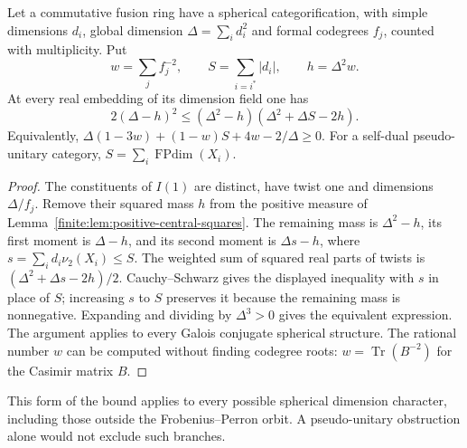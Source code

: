 \begin{proposition}\label{finite:prop:spherical-codegree-moment}
Let a commutative fusion ring have a spherical categorification, with
simple dimensions $d_i$, global dimension $\Delta=\sum_i d_i^2$ and
formal codegrees $f_j$, counted with multiplicity. Put
\[
 w=\sum_j f_j^{-2},\qquad
 S=\sum_{i=i^*}|d_i|,\qquad h=\Delta^2w.
\]
At every real embedding of its dimension field one has
\begin{equation}\label{finite:eq:spherical-codegree-moment}
 2(\Delta-h)^2\leq
 (\Delta^2-h)(\Delta^2+\Delta S-2h).
\end{equation}
Equivalently,
$\Delta(1-3w)+(1-w)S+4w-2/\Delta\geq0$.
For a self-dual pseudo-unitary category,
$S=\sum_i\operatorname{FPdim}(X_i)$.
\end{proposition}
\begin{proof}
The constituents of $I(1)$ are distinct, have twist one and dimensions
$\Delta/f_j$. Remove their squared mass $h$ from the positive measure
of Lemma~\ref{finite:lem:positive-central-squares}. The remaining mass is
$\Delta^2-h$, its first moment is $\Delta-h$, and its second moment is
$\Delta s-h$, where $s=\sum_i d_i\nu_2(X_i)\leq S$.
The weighted sum of squared real parts of twists is
$(\Delta^2+\Delta s-2h)/2$. Cauchy--Schwarz gives the displayed
inequality with $s$ in place of $S$; increasing $s$ to $S$ preserves it
because the remaining mass is nonnegative. Expanding and dividing by
$\Delta^3>0$ gives the equivalent expression.
The argument applies to every Galois conjugate spherical structure.
The rational number $w$ can be computed without finding codegree roots:
$w=\operatorname{Tr}(B^{-2})$ for the Casimir matrix $B$.
\end{proof}

This form of the bound applies to every possible spherical dimension
character, including those outside the Frobenius--Perron orbit. A pseudo-unitary obstruction alone would not exclude such branches.

